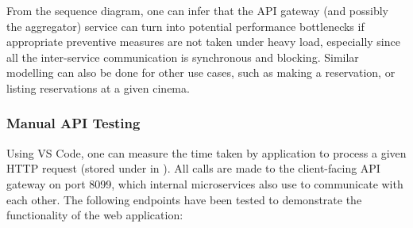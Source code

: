 From the sequence diagram, one can infer that the API gateway (and possibly the aggregator) service can turn into potential performance bottlenecks if appropriate preventive measures are not taken under heavy load, especially since all the inter-service communication is synchronous and blocking. Similar modelling can also be done for other use cases, such as making a reservation, or listing reservations at a given cinema.

\subsubsection{Manual API Testing}

Using VS Code, one can measure the time taken by application to process a given HTTP request (stored under  in ). All calls are made to the client-facing API gateway on port 8099, which internal microservices also use to communicate with each other. The following endpoints have been tested to demonstrate the functionality of the web application:

